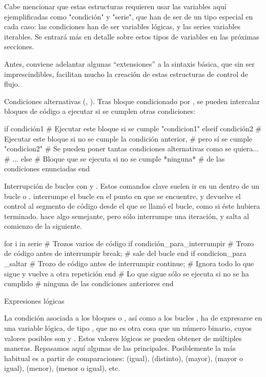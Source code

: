 ﻿\documentclass[spanish]{article}
\begin{document}
Cabe mencionar que estas estructuras requieren usar las variables aquí
ejemplificadas como "condición" y "serie", que han de ser de un tipo especial
en cada caso: las condiciones han de ser variables lógicas, y las series
variables iterables. Se entrará más en detalle sobre estos tipos de variables
en las próximas secciones.

Antes, conviene adelantar algunas ``extensiones'' a la sintaxis básica,
que sin ser imprescindibles, facilitan mucho la creación de estas estructuras
de control de flujo.

Condiciones alternativas (, ). Tras bloque condicionado
por , se pueden intercalar bloques de código a ejecutar si se
cumplen otras condiciones:

if condición1
  # Ejecutar este bloque si se cumple "condicion1"
elseif condición2
  # Ejecutar este bloque si no se cumple la condición anterior,
  # pero sí se cumple "condicion2"
  # Se pueden poner tantas condiciones alternativas como se quiera...
  # ...
else
  # Bloque que se ejecuta si no se cumple *ninguna*
  # de las condiciones enunciadas
end

Interrupción de bucles con  y . Estos comandos
clave suelen ir en un  dentro de un bucle  o .
 interrumpe el bucle en el punto en que se encuentre, y devuelve
el control al segmento de código desde el que se llamó el bucle, como si
éste hubiera terminado.  hace algo semejante, pero sólo
interrumpe una iteración, y salta al comienzo de la siguiente.

for i in serie
  # Trozos varios de código
  if condición_para_interrumpir
    # Trozo de código antes de interrumpir
    break; # sale del bucle
  end
  if condicion_para _saltar
    # Trozo de código antes de interrumpir
    continue;  # Ignora todo lo que sigue y vuelve a otra repetición
  end
  # Lo que sigue sólo se ejecuta si no se ha cumplido
  # ninguna de las condiciones anteriores
end


Expresiones lógicas

La condición asociada a los bloques  o , así como a los
bucles , ha de expresarse en una variable lógica, de tipo
, que no es otra cosa que un número binario, cuyos valores posibles
son  y .
Estos valores lógicos se pueden obtener de múltiples maneras. Repasamos aquí
algunas de las principales. Posiblemente la más habitual es a partir de 
comparaciones:
\code{==} (igual), \code{!=} (distinto),
\code{>} (mayor), \code{>=} (mayor o igual),
\code{<} (menor), \code{<=} (menor o igual), etc.
\end{document}
